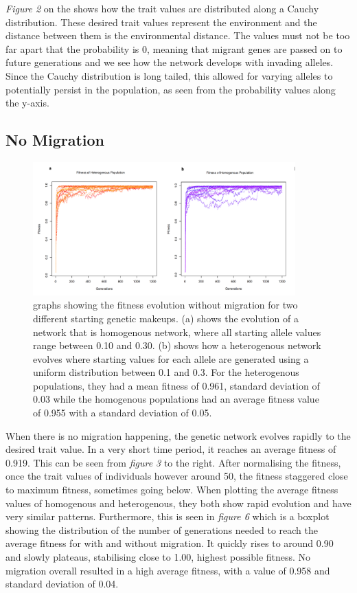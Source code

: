 \textit{Figure 2} on the shows how the trait values are distributed along a Cauchy distribution. These desired trait values represent the environment and the distance between them is the environmental distance. The values must not be too far apart that the probability is 0, meaning that migrant genes are passed on to future generations and we see how the network develops with invading alleles. Since the Cauchy distribution is long tailed, this allowed for varying alleles to potentially persist in the population, as seen from the probability values along the y-axis.
\subsection{No Migration}
\begin{figure}[h!]
    \centering
        \includegraphics[width=0.9\textwidth]{../Results/no_migration.jpg}
    \caption{graphs showing the fitness evolution without migration for two different starting genetic makeups. (a) shows the evolution of a network that is homogenous network, where all starting allele values range between 0.10 and 0.30. (b) shows how a heterogenous network evolves where starting values for each allele are generated using a uniform distribution between 0.1 and 0.3. For the heterogenous populations, they had a mean fitness of 0.961, standard deviation of 0.03 while the homogenous populations had an average fitness value of 0.955 with a standard deviation of 0.05.}
    \label{fig:No Migration}
\end{figure}
When there is no migration happening, the genetic network evolves rapidly to the desired trait value. In a very short time period, it reaches an average fitness of 0.919. This can be seen from \textit{figure 3} to the right. After normalising the fitness, once the trait values of individuals however around 50, the fitness staggered close to maximum fitness, sometimes going below. When plotting the average fitness values of homogenous and heterogenous, they both show rapid evolution and have very similar patterns. Furthermore, this is seen in \textit{figure 6} which is a boxplot showing the distribution of the number of generations needed to reach the average fitness for with and without migration. It quickly rises to around 0.90 and slowly plateaus, stabilising close to 1.00, highest possible fitness. No migration overall resulted in a high average fitness, with a value of 0.958 and standard deviation of 0.04.

